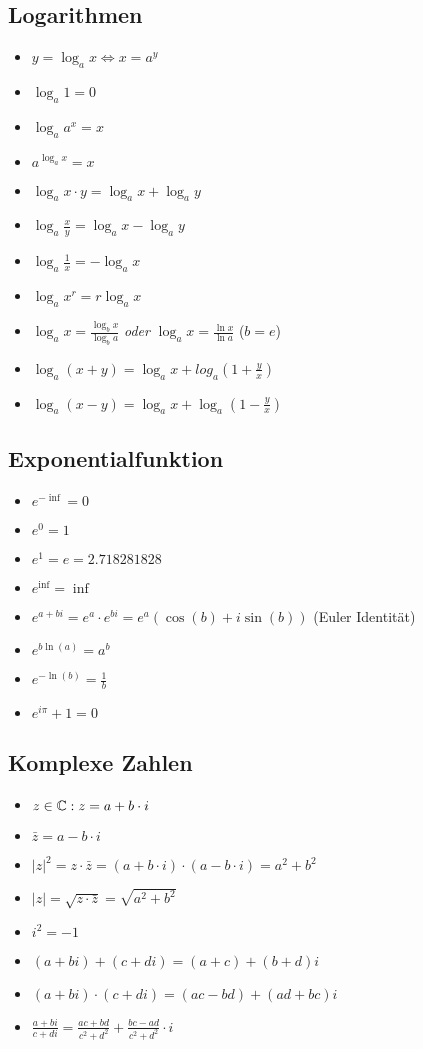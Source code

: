 \subsection{Logarithmen}
\begin{itemize}[leftmargin=*]
  \item $y = \log_a x \Leftrightarrow x = a^y$
  \item $\log_a 1 = 0$
  \item $\log_a a^x = x$
  \item $a^{\log_a x} = x $
  \item $\log_a x \cdot y = \log_a x + \log_a y$
  \item $\log_a \frac{x}{y} = \log_a x - \log_a y$
  \item $\log_a \frac{1}{x} = - \log_a x$
  \item $\log_a x^r = r \log_a x$
  \item $\log_a x = \frac{\log_b x}{\log_b a}$ \textit{oder} $\log_a x = \frac{\ln x}{\ln a}$ ($b=e$)
  \item $\log_a (x+y) = \log_a x + log_a (1 + \frac{y}{x})$
  \item $\log_a (x-y) = \log_a x + \log_a (1- \frac{y}{x})$
\end{itemize}

\subsection{Exponentialfunktion}
\begin{itemize}[leftmargin=*]
  \item $e^{-\inf} = 0$
  \item $e^0 = 1$
  \item $e^1 = e =  2.718281828$
  \item $e^{\inf} = \inf$
  \item $e^{a+bi} = e^{a} \cdot e^{bi} = e^a(\cos(b) + i \sin(b))$ (Euler Identität)
  \item $e^{b \ln(a)} = a^b$
  \item $e^{-\ln(b)} = \frac{1}{b}$
  \item $e^{i\pi} + 1 = 0$
\end{itemize}

\subsection{Komplexe Zahlen}
\begin{itemize}[leftmargin=*]
	\item $z \in \mathbb{C}: z = a + b\cdot i$
	\item $\bar{z} = a - b\cdot i$
	\item $|z|^2 = z \cdot \bar{z} = (a + b\cdot i) \cdot (a - b\cdot i) = a^2 + b^2$
	\item $|z| = \sqrt{z \cdot \bar{z}} = \sqrt{a^2 + b^2}$
	\item $i^2 = -1$
	\item $(a + bi) + (c + di) = (a + c) + (b + d)i$
	\item $(a + bi) \cdot (c + di) = (ac - bd) + (ad + bc)i$
	\item $\frac{a + bi}{c + di} = \frac{ac + bd}{c^2 + d^2} + \frac{bc - ad}{c^2 + d^2}\cdot i$
\end{itemize}
\pagebreak
